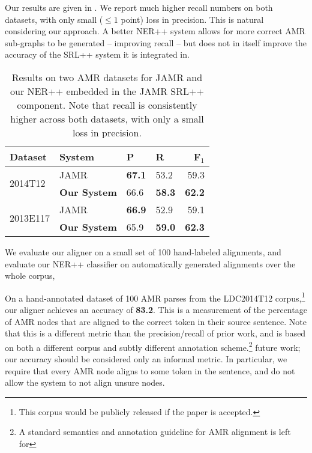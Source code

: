 \documentclass[11pt]{article}
\begin{document}
Our results are given in .
We report much higher recall numbers on both datasets, with only small ($\leq 1$ point) 
  loss in precision.
This is natural considering our approach.
A better NER++ system allows for more correct AMR sub-graphs to be generated --
  improving recall -- but does not in itself improve the accuracy of the
  SRL++ system it is integrated in.


\begin{table}[t]
\begin{center}
\begin{tabular}{l|l|llr}
\textbf{Dataset} &  \textbf{System} & \textbf{P} & \textbf{R} & \textbf{F$_1$} \\
\hline
\multirow{2}{*}{2014T12} & JAMR & \textbf{67.1} & 53.2 & 59.3 \\
  & \textbf{Our System} & 66.6 & \textbf{58.3} & \textbf{62.2} \\
\hline
\multirow{2}{*}{2013E117} & JAMR & \textbf{66.9} & 52.9 & 59.1 \\
  & \textbf{Our System} & 65.9 & \textbf{59.0} & \textbf{62.3} \\
\end{tabular}
\end{center}
\caption{\label{tab:results} 
Results on two AMR datasets for JAMR and our NER++ embedded in the JAMR SRL++
  component.
Note that recall is consistently higher across both datasets, with only a small
  loss in precision.
}
\end{table}

We evaluate our aligner on a small set of 100 hand-labeled alignments,
  and evaluate our NER++ classifier on automatically generated alignments over the whole corpus,
  
On a hand-annotated dataset of 100 AMR parses from the LDC2014T12 corpus,\footnote{
    This corpus would be publicly released if the paper is accepted.
  }
  our aligner achieves
  an accuracy of \textbf{83.2}.
This is a measurement of the percentage of AMR nodes that are
  aligned to the correct token in their source sentence.
Note that this is a different metric than the precision/recall of prior work, and
  is based on both a different corpus and subtly different annotation scheme.\footnote{ 
  A standard semantics and annotation guideline for AMR alignment is left for 
}
  future work; our accuracy should be considered only an informal metric.
In particular, we require that every AMR node aligns to some token in the sentence,
  and do not allow the system to not align unsure nodes.
\end{document}

